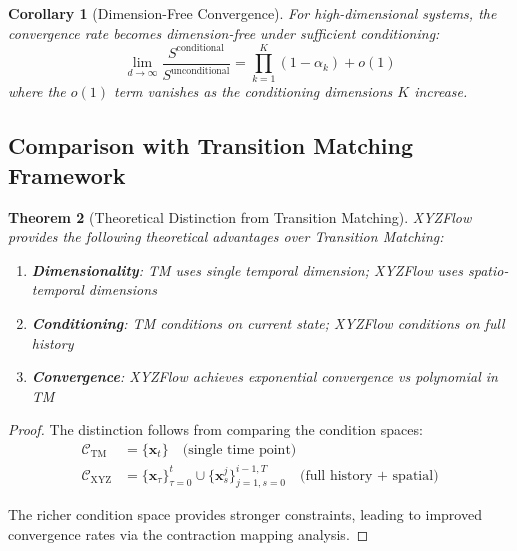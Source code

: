 \documentclass{article}
\theoremstyle{plain}
\newtheorem{theorem}{Theorem}[section]
\newtheorem{corollary}[theorem]{Corollary}
\theoremstyle{definition}
\theoremstyle{remark}
\newcommand{\vx}{\mathbf{x}}
\begin{document}
\begin{corollary}[Dimension-Free Convergence]
For high-dimensional systems, the convergence rate becomes dimension-free under sufficient conditioning:
\begin{equation}
\lim_{d \to \infty} \frac{S^{\text{conditional}}}{S^{\text{unconditional}}} = \prod_{k=1}^K (1 - \alpha_k) + o(1)
\end{equation}
where the $o(1)$ term vanishes as the conditioning dimensions $K$ increase.
\end{corollary}

\subsection{Comparison with Transition Matching Framework~\cite{shaul2025transition}}

\begin{theorem}[Theoretical Distinction from Transition Matching]
\label{thm:distinction_tm}
XYZFlow provides the following theoretical advantages over Transition Matching:
\begin{enumerate}
    \item \textbf{Dimensionality}: TM uses single temporal dimension; XYZFlow uses spatio-temporal dimensions
    \item \textbf{Conditioning}: TM conditions on current state; XYZFlow conditions on full history
    \item \textbf{Convergence}: XYZFlow achieves exponential convergence vs polynomial in TM
\end{enumerate}
\end{theorem}

\begin{proof}
The distinction follows from comparing the condition spaces:
\begin{align}
\mathcal{C}_{\text{TM}} &= \{\vx_t\} \quad \text{(single time point)} \\
\mathcal{C}_{\text{XYZ}} &= \{\vx_\tau\}_{\tau=0}^t \cup \{\vx_s^j\}_{j=1,s=0}^{i-1,T} \quad \text{(full history + spatial)}
\end{align}

The richer condition space provides stronger constraints, leading to improved convergence rates via the contraction mapping analysis.
\end{proof}

\end{document}

